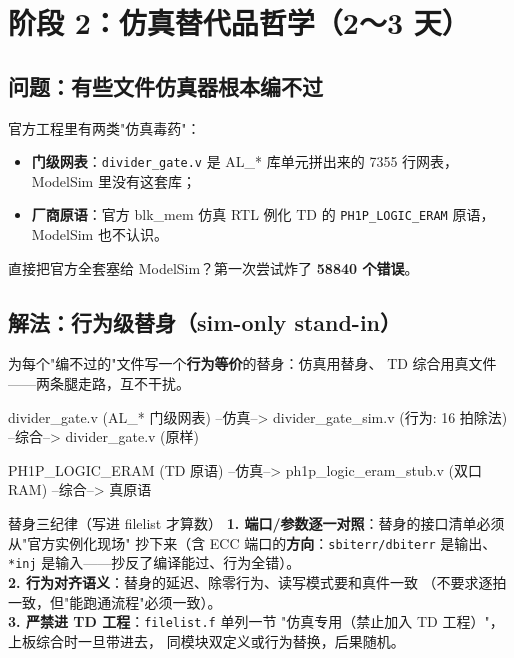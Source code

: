 \documentclass[11pt]{ctexart}
\newcommand{\code}[1]{\texttt{#1}}
\begin{document}
\section{阶段 2：仿真替代品哲学（2～3 天）}

\subsection{问题：有些文件仿真器根本编不过}

官方工程里有两类"仿真毒药"：

\begin{itemize}
  \item \textbf{门级网表}：\code{divider\_gate.v} 是 AL\_* 库单元拼出来的
    7355 行网表，ModelSim 里没有这套库；
  \item \textbf{厂商原语}：官方 blk\_mem 仿真 RTL 例化 TD 的
    \code{PH1P\_LOGIC\_ERAM} 原语，ModelSim 也不认识。
\end{itemize}

直接把官方全套塞给 ModelSim？第一次尝试炸了 \textbf{58840 个错误}。

\subsection{解法：行为级替身（sim-only stand-in）}

为每个"编不过的"文件写一个\textbf{行为等价}的替身：仿真用替身、
TD 综合用真文件——两条腿走路，互不干扰。

\begin{Verilog}
divider_gate.v (AL_* 门级网表)  --仿真-->  divider_gate_sim.v (行为: 16 拍除法)
                                --综合-->  divider_gate.v (原样)

PH1P_LOGIC_ERAM (TD 原语)       --仿真-->  ph1p_logic_eram_stub.v (双口 RAM)
                                --综合-->  真原语
\end{Verilog}

\begin{warnbox}{替身三纪律（写进 filelist 才算数）}
\textbf{1. 端口/参数逐一对照}：替身的接口清单必须从"官方实例化现场"
抄下来（含 ECC 端口的\textbf{方向}：\code{sbiterr/dbiterr} 是输出、
\code{*inj} 是输入——抄反了编译能过、行为全错）。\\
\textbf{2. 行为对齐语义}：替身的延迟、除零行为、读写模式要和真件一致
（不要求逐拍一致，但"能跑通流程"必须一致）。\\
\textbf{3. 严禁进 TD 工程}：\code{filelist.f} 单列一节
"仿真专用（禁止加入 TD 工程）"，上板综合时一旦带进去，
同模块双定义或行为替换，后果随机。
\end{warnbox}
\end{document}
